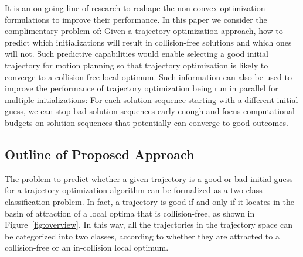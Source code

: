 \documentclass[letterpaper, 10 pt, conference]{ieeeconf}  %
\begin{document}
It is an on-going line of research to reshape the non-convex optimization formulations to improve their performance. In this paper we consider the complimentary problem of: Given a trajectory optimization approach, how to predict which initializations will result in collision-free solutions and which ones will not. Such predictive capabilities would enable selecting a good initial trajectory for motion planning so that trajectory optimization is likely to converge to a collision-free local optimum. Such information can also be used to improve the performance of trajectory optimization being run in parallel for multiple initializations: For each solution sequence starting with a different initial guess, we can stop bad solution sequences early enough and focus computational budgets on solution sequences that potentially can converge to good outcomes.

\subsection{Outline of Proposed Approach}
The problem to predict whether a given trajectory is a good or bad initial guess for a trajectory optimization algorithm can be formalized as a two-class classification problem. In fact, a trajectory is good if and only if it locates in the basin of attraction of a local optima that is collision-free, as shown in Figure~\ref{fig:overview}. In this way, all the trajectories in the trajectory space can be categorized into two classes, according to whether they are attracted to a collision-free or an in-collision local optimum.  
\end{document}
